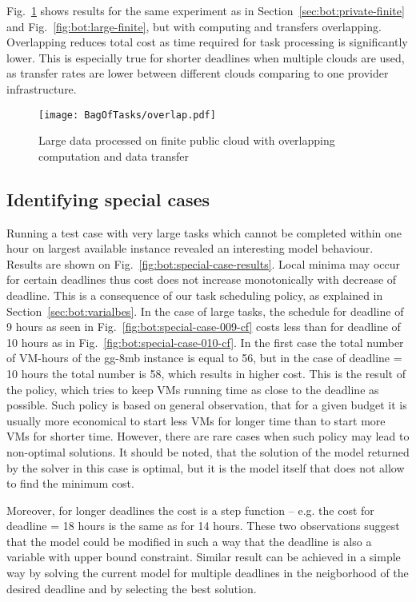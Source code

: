{  Fig.~\ref{fig:bot:large-finite-overlap} shows results for the same experiment as in Section~\ref{sec:bot:private-finite} and Fig.~\ref{fig:bot:large-finite}, but with computing and transfers overlapping. Overlapping reduces total cost as time required for task processing is significantly lower.  This is especially true for shorter deadlines when multiple  clouds are used, as transfer rates are lower between different clouds comparing to one provider infrastructure.
  
  \begin{figure}[tb]
     \centering
     \texttt{[image: BagOfTasks/overlap.pdf]}
     \caption{Large data processed on finite public cloud with overlapping computation and data transfer\label{fig:bot:large-finite-overlap}}
  \end{figure}  

\subsection{Identifying special cases}
\label{sec:bot:special}
  
  Running a test case with very large tasks which cannot be completed within one hour on largest available instance revealed an interesting model behaviour. Results are shown on Fig.~\ref{fig:bot:special-case-results}. Local minima may occur for certain deadlines thus cost does not increase monotonically with decrease of deadline. This is a consequence of our task scheduling policy, as explained in Section~\ref{sec:bot:varialbes}. In the case of large tasks, the schedule for deadline of 9 hours  as seen in Fig.~\ref{fig:bot:special-case-009-cf} costs less than for deadline of 10 hours as in Fig.~\ref{fig:bot:special-case-010-cf}. In the first case the total number of VM-hours of the gg-8mb instance is equal to 56, but in the case of deadline = 10 hours the total number is 58, which results in higher cost. This is the result of the policy, which tries to keep VMs running time as close to the deadline as possible. Such policy is based on general observation, that for a given budget it is usually more economical to start less VMs for longer time than to start more VMs for shorter time. However, there are rare cases when such policy may lead to non-optimal solutions. It should be noted, that the solution of the model returned by the solver in this case is optimal, but it is the model itself that does not allow to find the minimum cost.
  
  Moreover, for longer deadlines the cost is a step function -- e.g. the cost for deadline = 18 hours is the same as for 14 hours. These two observations suggest that the model could be modified in such a way that the deadline is also a variable with upper bound constraint. Similar result can be achieved in a simple way by solving the current model for multiple deadlines in the neigborhood of the desired deadline and by selecting the best solution.  
  
}
